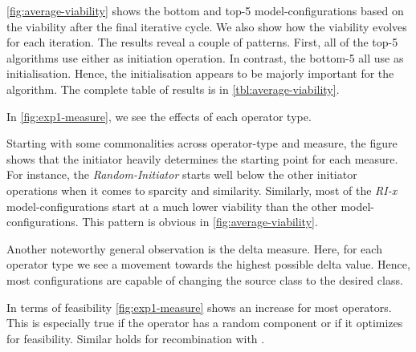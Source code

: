 \documentclass[./../../paper.tex]{subfiles}
\begin{document}
\autoref{fig:average-viability} shows the bottom and top-5 model-configurations based on the viability after the final iterative cycle. We also show how the viability evolves for each iteration. The results reveal a couple of patterns. 
First, all of the top-5 algorithms use either  as initiation operation. In contrast, the bottom-5 all use  as initialisation. Hence, the initialisation appears to be majorly important for the algorithm.
The complete table of results is in \autoref{tbl:average-viability}.




In \autoref{fig:exp1-measure}, we see the effects of each operator type. 

Starting with some commonalities across operator-type and measure, the figure shows that the initiator heavily determines the starting point for each measure. For instance, the \emph{Random-Initiator} starts well below the other initiator operations when it comes to sparcity and similarity. Similarly, most of the \emph{RI-x} model-configurations start at a much lower viability than the other model-configurations. This pattern is obvious in \autoref{fig:average-viability}. 

Another noteworthy general observation is the delta measure. Here, for each operator type we see a movement towards the highest possible delta value. Hence, most configurations are capable of changing the source class to the desired class. 

In terms of feasibility \autoref{fig:exp1-measure} shows an increase for most operators. This is especially true if the operator has a random component or if it optimizes for feasibility. Similar holds for recombination with .
\end{document}
